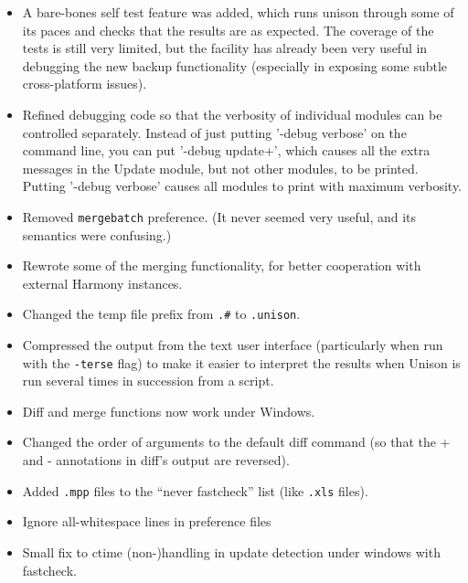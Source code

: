 \begin{changesfromversion}{2.17}
\begin{itemize}
\item A bare-bones self test feature was added, which runs unison through
  some of its paces and checks that the results are as expected.  The
  coverage of the tests is still very limited, but the facility has already
  been very useful in debugging the new backup functionality (especially in
  exposing some subtle cross-platform issues).

\item Refined debugging code so that the verbosity of individual modules
  can be controlled separately.  Instead of just putting '-debug
  verbose' on the command line, you can put '-debug update+', which
  causes all the extra messages in the Update module, but not other
  modules, to be printed.  Putting '-debug verbose' causes all modules
  to print with maximum verbosity.

\item Removed \verb|mergebatch| preference.  (It never seemed very useful, and
  its semantics were confusing.)
  
\item Rewrote some of the merging functionality, for better cooperation
  with external Harmony instances.

\item Changed the temp file prefix from \verb|.#| to \verb|.unison|.

\item Compressed the output from the text user interface (particularly
  when run with the \verb|-terse| flag) to make it easier to interpret the
  results when Unison is run several times in succession from a script.

\item Diff and merge functions now work under Windows.

\item Changed the order of arguments to the default diff command (so that
  the + and - annotations in diff's output are reversed).

\item Added \verb|.mpp| files to the ``never fastcheck'' list (like
\verb|.xls| files). 

\item Ignore all-whitespace lines in preference files

\item Small fix to ctime (non-)handling in update detection under windows
  with fastcheck.  
\end{itemize}


\end{changesfromversion}
